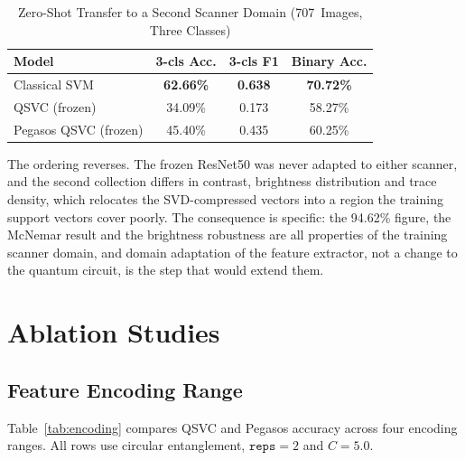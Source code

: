 \documentclass[10pt,conference]{IEEEtran}
\begin{document}
\begin{table}[t]
\caption{Zero-Shot Transfer to a Second Scanner Domain
         (707~Images, Three Classes)}
\label{tab:transfer}
\centering
\renewcommand{\arraystretch}{1.1}
\begin{tabular}{lccc}
\toprule
Model & 3-cls Acc. & 3-cls F1 & Binary Acc.\\
\midrule
Classical SVM        & \textbf{62.66\%} & \textbf{0.638} & \textbf{70.72\%}\\
QSVC (frozen)        & 34.09\% & 0.173 & 58.27\%\\
Pegasos QSVC (frozen) & 45.40\% & 0.435 & 60.25\%\\
\bottomrule
\end{tabular}
\end{table}

The ordering reverses. The frozen ResNet50 was never adapted to either
scanner, and the second collection differs in contrast, brightness
distribution and trace density, which relocates the SVD-compressed
vectors into a region the training support vectors cover poorly. The
consequence is specific: the 94.62\% figure, the McNemar result and the
brightness robustness are all properties of the training scanner domain,
and domain adaptation of the feature extractor, not a change to the
quantum circuit, is the step that would extend them.

\section{Ablation Studies}
\label{sec:ablation}

\subsection{Feature Encoding Range}

Table~\ref{tab:encoding} compares QSVC and Pegasos accuracy across four
encoding ranges. All rows use circular entanglement,
$\texttt{reps}\!=\!2$ and $C\!=\!5.0$.
\end{document}
